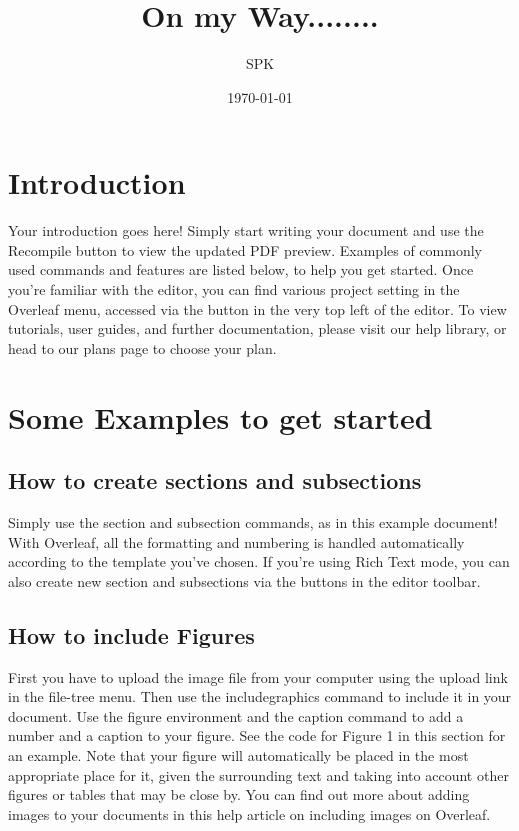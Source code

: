 \documentclass{article}
\begin{document}
\title{On my Way........}
\author{SPK}
\date{\today}
\maketitle
\section{Introduction}
Your introduction goes here! Simply start writing your document and use the Recompile button to
view the updated PDF preview. Examples of commonly used commands and features are listed below,
to help you get started.
Once you’re familiar with the editor, you can find various project setting in the Overleaf menu,
accessed via the button in the very top left of the editor. To view tutorials, user guides, and further
documentation, please visit our help library, or head to our plans page to choose your plan.
\section{Some Examples to get started}
\subsection{How to create sections and subsections}
Simply use the section and subsection commands, as in this example document! With Overleaf, all
the formatting and numbering is handled automatically according to the template you’ve chosen. If
you’re using Rich Text mode, you can also create new section and subsections via the buttons in the
editor toolbar.
\subsection{How to include Figures}
First you have to upload the image file from your computer using the upload link in the file-tree menu.
Then use the includegraphics command to include it in your document. Use the figure environment
and the caption command to add a number and a caption to your figure. See the code for Figure 1 in
this section for an example.
Note that your figure will automatically be placed in the most appropriate place for it, given the
surrounding text and taking into account other figures or tables that may be close by. You can find
out more about adding images to your documents in this help article on including images on Overleaf.
\end{document}
